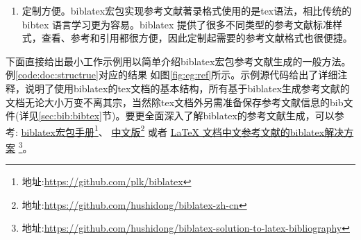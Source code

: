 \begin{enumerate}
        \begin{example}{输出引用文献数据时的biber选项}{eg:bibercmd:outbibfile}
        \begin{texlist}
        biber jobname.tex --output-format=bibtex
        \end{texlist}
        \end{example}


\item 定制方便。biblatex宏包实现参考文献著录格式使用的是tex语法，相比传统的bibtex 语言学习更为容易。biblatex 提供了很多不同类型的参考文献标准样式，查看、参考和引用都很方便，因此定制起需要的参考文献格式也很便捷。
\end{enumerate}


下面直接给出最小工作示例用以简单介绍biblatex宏包参考文献生成的一般方法。例\ref{code:doc:structrue}对应的结果
如图\ref{fig:eg:ref}所示。示例源代码给出了详细注释，说明了使用biblatex的tex文档的基本结构，所有基于biblatex生成参考文献的文档无论大小万变不离其宗，当然除tex文档外另需准备保存参考文献信息的bib文件(详见\ref{sec:bib:bibtex}节)。要更全面深入了解biblatex的参考文献生成，可以参考:
\href{https://github.com/plk/biblatex}{biblatex宏包手册}\footnote{地址:\url{https://github.com/plk/biblatex}}、
\href{https://github.com/hushidong/biblatex-zh-cn}{中文版}\footnote{地址:\url{https://github.com/hushidong/biblatex-zh-cn}}
或者
\href{https://github.com/hushidong/biblatex-solution-to-latex-bibliography}{LaTeX 文档中文参考文献的biblatex解决方案}
\footnote{地址:\url{https://github.com/hushidong/biblatex-solution-to-latex-bibliography}}。

